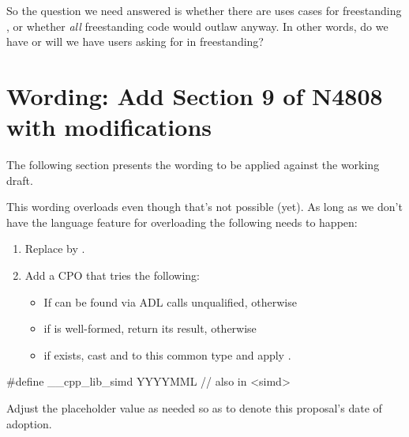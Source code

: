So the question we need answered is whether there are uses cases for
freestanding \simd, or whether \emph{all} freestanding code would outlaw \simd
anyway.
In other words, do we have or will we have users asking for \simd in
freestanding?

\section{Wording: Add Section 9 of N4808 with modifications}\label{sec:wording}

The following section presents the wording to be applied against the \CC{}
working draft.

This wording overloads  even though that's not possible (yet).
As long as we don't have the language feature for overloading  the following needs to happen:
\begin{enumerate}
  \item Replace  by .
  \item Add a \std{} CPO that tries the following:
    \begin{itemize}
      \item If  can be found via ADL calls  unqualified, otherwise
      \item if  is well-formed, return its result, otherwise
      \item if \std{} exists, cast  and  to this common type and apply .
    \end{itemize}
\end{enumerate}

\begin{wgText}
  \begin{codeblock}
    #define __cpp_lib_simd YYYYMML // also in <simd>
  \end{codeblock}
\end{wgText}
Adjust the placeholder value as needed so as to denote this proposal's date of adoption.

\begin{wgText}
  \setcounter{WGClause}{28}
  \setcounter{WGSubSection}{8}
  
\end{wgText}


